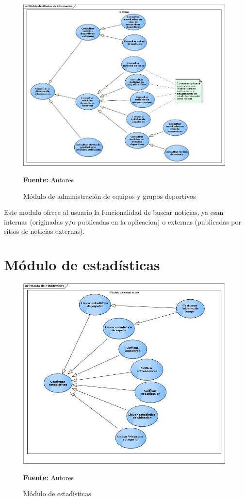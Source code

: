 \begin{figure}[!htb]
  \begin{center}
    \includegraphics[width=11cm]{./imagenes/casos_uso/difusion_informacion.png}
    \caption{Módulo de administración de equipos y grupos deportivos}
    \label{fig:cu_admin_equip_grup}
    \textbf{Fuente:} Autores \\
  \end{center}
\end{figure}

Este modulo ofrece al usuario la funcionalidad de buscar noticias, ya esan internas (originadas y/o publicadas en la aplicacion) o externas (publicadas por sitios de noticias externas).

\section{Módulo de estadísticas}

\begin{figure}[!htb]
  \begin{center}
    \includegraphics[width=11cm]{./imagenes/casos_uso/gestion_estadisticas.png}
    \caption{Módulo de estadísticas}
    \label{fig:cu_estad}
    \textbf{Fuente:} Autores \\
  \end{center}
\end{figure}

